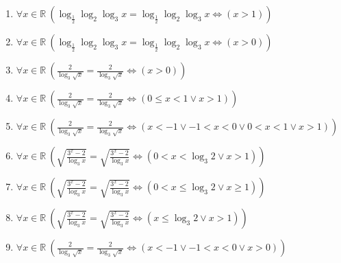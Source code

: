 \documentclass[11pt,a4paper]{article}
\begin{document}
\begin{enumerate}
\item $\displaystyle \forall x \in \mathbb{R}\ \left( \log_{\frac{1}{2}}\log_{2}\log_{3} x = \log_{\frac{1}{2}}\log_{2}\log_{3} x \iff \left( x > 1 \right) \right)$
\item $\displaystyle \forall x \in \mathbb{R}\ \left( \log_{\frac{1}{2}}\log_{2}\log_{3} x = \log_{\frac{1}{2}}\log_{2}\log_{3} x \iff \left( x > 0 \right) \right)$
\item $\displaystyle \forall x \in \mathbb{R}\ \left( \frac{2}{\log_{3}\sqrt{x}} = \frac{2}{\log_{3}\sqrt{x}} \iff \left( x > 0 \right) \right)$
\item $\displaystyle \forall x \in \mathbb{R}\ \left( \frac{2}{\log_{3}\sqrt{x}} = \frac{2}{\log_{3}\sqrt{x}} \iff \left( 0 \le x < 1 \lor x > 1 \right) \right)$
\item $\displaystyle \forall x \in \mathbb{R}\ \left( \frac{2}{\log_{3}\sqrt{x}} = \frac{2}{\log_{3}\sqrt{x}} \iff \left( x < -1 \lor -1 < x < 0 \lor 0 < x < 1 \lor x > 1 \right) \right)$
\item $\displaystyle \forall x \in \mathbb{R}\ \left( \sqrt{\frac{3^{x} - 2}{\log_{3} x}} = \sqrt{\frac{3^{x} - 2}{\log_{3} x}} \iff \left( 0 < x < \log_{3} 2 \lor x > 1 \right) \right)$
\item $\displaystyle \forall x \in \mathbb{R}\ \left( \sqrt{\frac{3^{x} - 2}{\log_{3} x}} = \sqrt{\frac{3^{x} - 2}{\log_{3} x}} \iff \left( 0 < x \le \log_{3} 2 \lor x \ge 1 \right) \right)$
\item $\displaystyle \forall x \in \mathbb{R}\ \left( \sqrt{\frac{3^{x} - 2}{\log_{3} x}} = \sqrt{\frac{3^{x} - 2}{\log_{3} x}} \iff \left( x \le \log_{3} 2 \lor x > 1 \right) \right)$
\item $\displaystyle \forall x \in \mathbb{R}\ \left( \frac{2}{\log_{3}\sqrt{x}} = \frac{2}{\log_{3}\sqrt{x}} \iff \left( x < -1 \lor -1 < x < 0 \lor x > 0 \right) \right)$
\end{enumerate}
\end{document}

